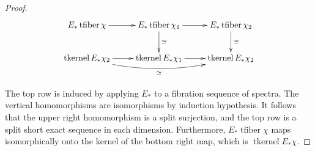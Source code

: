 \documentclass[12pt]{amsart}
\newcommand{\R}{{\mathbb R}}
\newcommand{\Z}{{\mathbb Z}}
\newcommand{\hofiber}{\operatorname{hofiber}}
\newcommand{\holim}{\operatorname{holim}}
\newcommand{\tfiber}{\operatorname{tfiber}}
\newcommand{\tkernel}{\operatorname{tkernel}}
\newcommand{\rImm}{\operatorname{rImm}}
\newcommand{\Ho}{\operatorname{H}}
\newcommand{\rConf}{\operatorname{rConf}}
\newcommand{\HZ}{\underline{H}\Z}
\theoremstyle{plain}
\theoremstyle{definition}
\theoremstyle{remark}
\begin{document}
\begin{proof}
\[
\xymatrix{
 {E_*\tfiber \chi}	\ar[r] & {E_*\tfiber\chi_1} \ar[r]\ar[d]^\cong & {E_*\tfiber\chi_2} \ar[d]^\cong \\
{\tkernel E_*\chi_2} \ar[r] \ar@/_1pc/[rr]_\cong& {\tkernel E_*\chi_1} \ar[r] & {\tkernel E_*\chi_2}
}
\]



The top row is induced by applying $E_*$ to a fibration sequence of spectra. The vertical homomorphisms are isomorphisms by induction hypothesis. It follows that the upper right homomorphism is a split surjection, and the top row is a split short exact sequence in each dimension. Furthermore, $E_*\tfiber\chi$ maps isomorphically onto the kernel of the bottom right map, which is $\tkernel E_*\chi$.
\end{proof}
%
%
%
%
\end{document}
